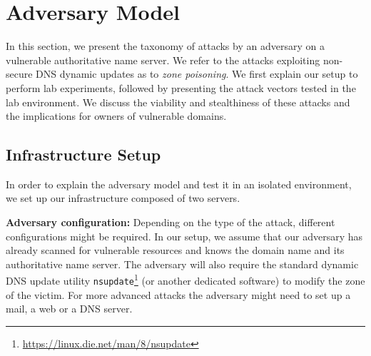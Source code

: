 \section{Adversary Model}

In this section, we present the taxonomy of attacks by an adversary on a vulnerable authoritative name server.
We refer to the attacks exploiting non-secure DNS dynamic updates as to \textit{zone poisoning}.
%
We first explain our setup to perform lab experiments, followed by 
presenting the attack vectors tested in the lab environment. 
We discuss the viability and stealthiness of these attacks and %
the implications for owners of vulnerable domains.


\subsection{Infrastructure Setup}

In order to explain the adversary model and test it in an isolated environment, we set up our infrastructure %
composed of two servers. 


\textbf{Adversary configuration:} Depending on the type of the attack, different configurations might be required. 
In our setup, we assume that our adversary has already scanned for vulnerable 
resources and knows the domain name and its authoritative name server.
The adversary will also require the standard dynamic DNS update utility \texttt{nsupdate}\footnote{%
\url{https://linux.die.net/man/8/nsupdate}} (or another dedicated software) to modify the zone of the victim. %
For more advanced attacks the adversary might need to set up a mail, a web or a DNS server.

